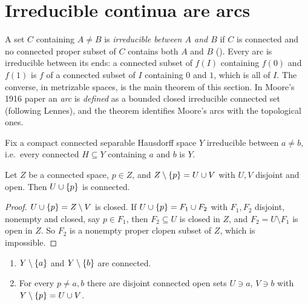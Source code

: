 
\section{Irreducible continua are arcs}

A set $C$ containing $A\ne B$ is \emph{irreducible between $A$ and $B$} if $C$ is connected and no
connected proper subset of $C$ contains both $A$ and $B$ (). Every arc is
irreducible between its ends: a connected subset of $f(I)$ containing $f(0)$ and $f(1)$ is $f$ of a
connected subset of $I$ containing $0$ and $1$, which is all of $I$. The converse, in metrizable
spaces, is the main theorem of this section. In Moore's 1916 paper an \emph{arc} is \emph{defined}
as a bounded closed irreducible connected set (following Lennes), and the theorem identifies
Moore's arcs with the topological ones.

Fix a compact connected separable Hausdorff space $Y$ irreducible between $a\ne b$, i.e.\ every
connected $H\subseteq Y$ containing $a$ and $b$ is $Y$.

\begin{lemma}\label{lem:insert-conn}
Let $Z$ be a connected space, $p\in Z$, and $Z\setminus\left\{ p \right\}=U\cup V$ with $U,V$ disjoint and open.
Then $U\cup\left\{ p \right\}$ is connected.
\end{lemma}

\begin{proof}
$U\cup\left\{ p \right\}=Z\setminus V$ is closed. If $U\cup\left\{ p \right\}=F_1\cup F_2$ with $F_1,F_2$ disjoint, nonempty
and closed, say $p\in F_1$, then $F_2\subseteq U$ is closed in $Z$, and $F_2=U\setminus F_1$ is open
in $Z$. So $F_2$ is a nonempty proper clopen subset of $Z$, which is impossible.
\end{proof}


\begin{lemma}[Cuts]\label{lem:cut}
\leavevmode
\begin{enumerate}[label=(\alph*)]
\item $Y\setminus\left\{ a \right\}$ and $Y\setminus\left\{ b \right\}$ are connected.
\item For every $p\ne a,b$ there are disjoint connected open sets $U\ni a$, $V\ni b$ with
$Y\setminus\left\{ p \right\}=U\cup V$.
\end{enumerate}
\end{lemma}


